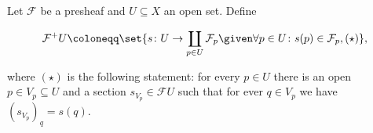 Let $\mathcal{F}$ be a presheaf and $U \subseteq X$ an open set.
Define

\[ \mathcal{F}^+U\coloneqq \set{s\colon U\to \coprod_{p \in U}\mathcal{F}_p\given \forall p \in U\colon s(p) \in \mathcal{F}_p, (\star)}, \]

where $(\star)$ is the following statement: for every $p \in U$ there is an open
$p \in V_p \subseteq U$ and a section $s_{V_p} \in \mathcal{F}U$ such that
for ever $q \in V_p$ we have $(s_{V_p})_q = s(q)$.
